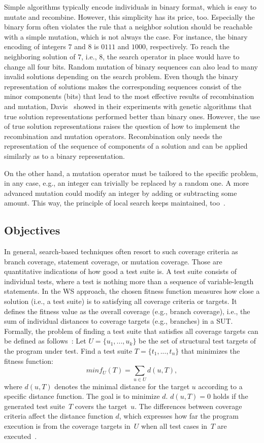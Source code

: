 \documentclass[paper=a4,%
  twoside,%
  BCOR4mm,%
  abstract=true,%
  toc=bibliography,%
  chapterprefix=true,%
  toc=bibliographynumbered,%
  open=right,%
  english,%
  pagesize=pdftex]{scrreprt}
\begin{document}
Simple algorithms typically encode individuals in binary format, which is easy to mutate and recombine. However, this simplicity has its price, too. Especially the binary form often violates the rule that a neighbor solution should be reachable with a simple mutation, which is not always the case. For instance, the binary encoding of integers $7$ and $8$ is $0111$ and $1000$, respectively. To reach the neighboring solution of $7$, i.e., $8$, the search operator in place would have to change all four bits. Random mutation of binary sequences can also lead to many invalid solutions depending on the search problem. Even though the binary representation of solutions makes the corresponding sequences consist of the minor components (bits) that lead to the most effective results of recombination and mutation, Davis~\cite{Davis1991} showed in their experiments with genetic algorithms that true solution representations performed better than binary ones. However, the use of true solution representations raises the question of how to implement the recombination and mutation operators. Recombination only needs the representation of the sequence of components of a solution and can be applied similarly as to a binary representation. 

On the other hand, a mutation operator must be tailored to the specific problem, in any case, e.g., an integer can trivially be replaced by a random one. A more advanced mutation could modify an integer by adding or subtracting some amount. This way, the principle of local search keeps maintained, too~\cite{Davis1991}.


\subsection{Objectives}
In general, search-based techniques often resort to such coverage criteria as branch coverage, statement coverage, or mutation coverage. Those are quantitative indications of how good a test suite is. A test suite consists of individual tests, where a test is nothing more than a sequence of variable-length statements. In the \ac{WS} approach, the chosen fitness function measures how close a solution (i.e., a test suite) is to satisfying all coverage criteria or targets. It defines the fitness value as the overall coverage (e.g., branch coverage), i.e., the sum of individual distances to coverage targets (e.g., branches) in a \ac{SUT}. Formally, the problem of finding a test suite that satisfies all coverage targets can be defined as follows~\cite{Panichella2018}: Let $U = \{u_1, ..., u_k\}$ be the set of structural test targets of the program under test. Find a test suite $T = \{t_1, ..., t_n\}$ that minimizes the fitness function:
\begin{equation}
minf_U(T) = \sum_{u \in U}{d(u, T)},
\end{equation}
where $d(u, T)$ denotes the minimal distance for the target $u$ according to a specific distance function. The goal is to minimize $d$. $d(u, T) = 0$ holds if the generated test suite~$T$ covers the target~$u$. The differences between coverage criteria affect the distance function $d$, which expresses how far the program execution is from the coverage targets in~$U$ when all test cases in~$T$ are executed~\cite{Panichella2018}.
\end{document}
